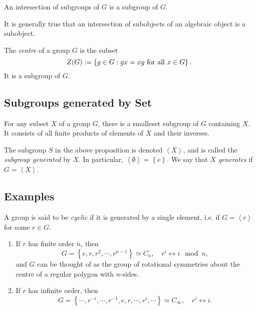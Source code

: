\begin{proposition}
  An intersection of subgroups of \( G \) is a subgroup of \( G \).
\end{proposition}
\begin{remark}
  It is generally true that an intersection of subobjects of an algebraic object
  is a subobject.
\end{remark}

\begin{definition}
  The \emph{centre} of a group \( G \) is the subset
  \[
    Z(G) := \left\lbrace g \in G: gx = xg \textmd{ for all } x \in G \right\rbrace.
  \]
  It is a subgroup of \( G \).
\end{definition}

\subsection{Subgroups generated by Set}

\begin{proposition}
  For any subset \( X \) of a group \( G \), there is a smalleset subgroup of \( G \) containing \( X \).
  It consists of all finite products of elements of \( X \) and their inverses.
\end{proposition}

\begin{definition}
  The subgroup \( S \) in the above proposition is denoted \( \left\langle X
  \right\rangle \), and is called the \emph{subgroup generated} by \( X \). In
  particular, \( \left\langle \emptyset \right\rangle = \left\lbrace e
  \right\rbrace \). We say that \( X \) \emph{generates} if \( G = \left\langle
  X \right\rangle \).
\end{definition}

\subsection{Examples}

\begin{example}
  A group is said to be \emph{cyclic} if it is generated by a single element, i.e. if \( G = \left\langle r \right\rangle \) for some \( r \in G \).
  \begin{enumerate}
    \item If \( r \) has finite order \( n \), then
      \[
        G = \left\lbrace e, r, r^2, \cdots, r^{n - 1} \right\rbrace \simeq C_n,\quad r^i \leftrightarrow i \mod{n},
      \]
      and \( G \) can be thought of as the group of rotational symmetries about the centre of a regular polygon with \( n \)-sides.
    \item If \( r \) has infinite order, then
      \[
        G = \left\lbrace \cdots, r^{-i}, \cdots, r^{-1}, e, r, \cdots, r^i, \cdots \right\rbrace \simeq C_\infty,\quad r^i \leftrightarrow i.
      \]
  \end{enumerate}
\end{example}


